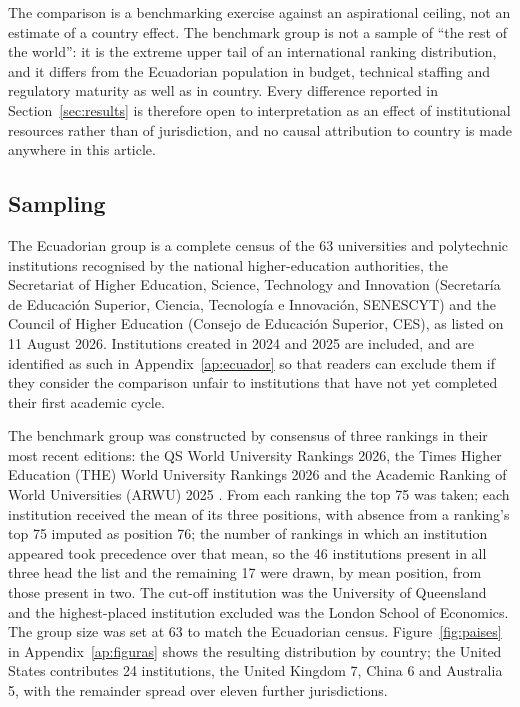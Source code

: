\documentclass[pdflatex,sn-basic,Numbered,iicol]{sn-jnl}
\theoremstyle{thmstyleone}
\theoremstyle{thmstyletwo}
\theoremstyle{thmstylethree}
\begin{document}
	The comparison is a benchmarking exercise against an aspirational ceiling, not an estimate of a country effect. The benchmark group is not a sample of ``the rest of the world'': it is the extreme upper tail of an international ranking distribution, and it differs from the Ecuadorian population in budget, technical staffing and regulatory maturity as well as in country. Every difference reported in Section~\ref{sec:results} is therefore open to interpretation as an effect of institutional resources rather than of jurisdiction, and no causal attribution to country is made anywhere in this article.
	
	\subsection{Sampling}\label{sec:methods-sampling}
	
	The Ecuadorian group is a complete census of the 63 universities and polytechnic institutions recognised by the national higher-education authorities, the Secretariat of Higher Education, Science, Technology and Innovation (Secretar\'ia de Educaci\'on Superior, Ciencia, Tecnolog\'ia e Innovaci\'on, SENESCYT) and the Council of Higher Education (Consejo de Educaci\'on Superior, CES), as listed on 11 August 2026. Institutions created in 2024 and 2025 are included, and are identified as such in Appendix~\ref{ap:ecuador} so that readers can exclude them if they consider the comparison unfair to institutions that have not yet completed their first academic cycle.
	
	The benchmark group was constructed by consensus of three rankings in their most recent editions: the QS World University Rankings 2026, the Times Higher Education (THE) World University Rankings 2026 and the Academic Ranking of World Universities (ARWU) 2025 \citep{qs2026,the2026,arwu2025}. From each ranking the top 75 was taken; each institution received the mean of its three positions, with absence from a ranking's top 75 imputed as position 76; the number of rankings in which an institution appeared took precedence over that mean, so the 46 institutions present in all three head the list and the remaining 17 were drawn, by mean position, from those present in two. The cut-off institution was the University of Queensland and the highest-placed institution excluded was the London School of Economics. The group size was set at 63 to match the Ecuadorian census. Figure~\ref{fig:paises} in Appendix~\ref{ap:figuras} shows the resulting distribution by country; the United States contributes 24 institutions, the United Kingdom 7, China 6 and Australia 5, with the remainder spread over eleven further jurisdictions.
	
\end{document}
